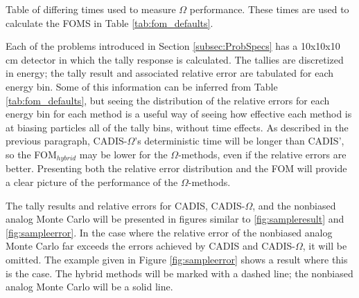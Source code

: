 \begin{table}[h!]
  \centering
  
  \caption[Table of differing times used to measure $\Omega$ performance.]{
    Table of differing times used to measure $\Omega$ performance. These times
    are used to calculate the FOMS in Table \ref{tab:fom_defaults}. }
  \label{tab:time_defaults}
\end{table}

Each of the problems introduced in Section \ref{subsec:ProbSpecs} has a
10x10x10 cm detector in which the tally response is calculated. The tallies are
discretized in energy; the tally result and associated relative error are
tabulated for each energy bin. Some of this information can be inferred from Table
\ref{tab:fom_defaults},
but seeing the distribution of the relative errors for each energy
bin for each method is a useful way of seeing how effective each method is at
biasing particles all of the tally bins,
without time effects. As described in the previous paragraph, CADIS-$\Omega$'s
deterministic time will be longer than CADIS', so the FOM$_{hybrid}$ may be
lower for the $\Omega$-methods, even if the relative errors are better.
Presenting both the relative error distribution and the FOM will provide a clear
picture of the performance of the $\Omega$-methods.

The tally results and relative errors for CADIS,
CADIS-$\Omega$, and the nonbiased analog Monte Carlo will be
presented in figures similar to
\ref{fig:sampleresult} and \ref{fig:sampleerror}.
In the case where the
relative error of the nonbiased analog Monte Carlo far exceeds the errors
achieved by CADIS and CADIS-$\Omega$, it will be omitted. The example given in
Figure \ref{fig:sampleerror} shows a result where this is the case.
The hybrid methods
will be marked with a dashed line; the nonbiased analog Monte Carlo will be a
solid line.


